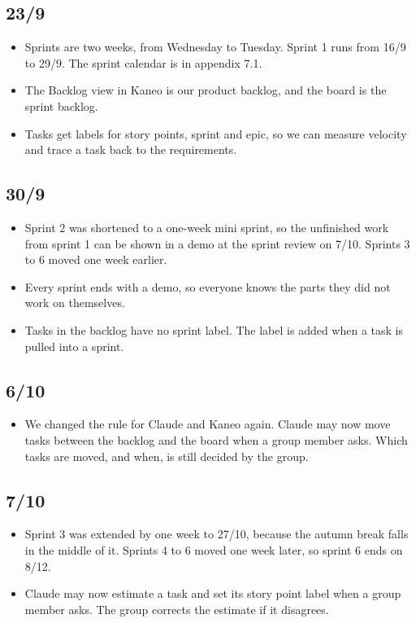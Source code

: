 \documentclass[a4paper,11pt]{article}
\begin{document}
\subsection*{23/9}
\begin{itemize}
    \item Sprints are two weeks, from Wednesday to Tuesday. Sprint 1 runs from 16/9 to 29/9. The sprint calendar is in appendix 7.1.
    \item The Backlog view in Kaneo is our product backlog, and the board is the sprint backlog.
    \item Tasks get labels for story points, sprint and epic, so we can measure velocity and trace a task back to the requirements.
\end{itemize}

\subsection*{30/9}
\begin{itemize}
    \item Sprint 2 was shortened to a one-week mini sprint, so the unfinished work from sprint 1 can be shown in a demo at the sprint review on 7/10. Sprints 3 to 6 moved one week earlier.
    \item Every sprint ends with a demo, so everyone knows the parts they did not work on themselves.
    \item Tasks in the backlog have no sprint label. The label is added when a task is pulled into a sprint.
\end{itemize}

\subsection*{6/10}
\begin{itemize}
    \item We changed the rule for Claude and Kaneo again. Claude may now move tasks between the backlog and the board when a group member asks. Which tasks are moved, and when, is still decided by the group.
\end{itemize}

\subsection*{7/10}
\begin{itemize}
    \item Sprint 3 was extended by one week to 27/10, because the autumn break falls in the middle of it. Sprints 4 to 6 moved one week later, so sprint 6 ends on 8/12.
    \item Claude may now estimate a task and set its story point label when a group member asks. The group corrects the estimate if it disagrees.
\end{itemize}
\end{document}
